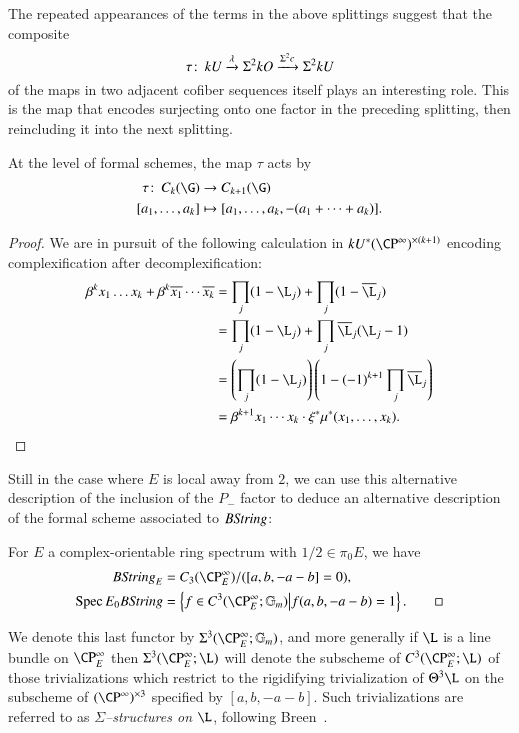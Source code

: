 The repeated appearances of the terms in the above splittings suggest that the composite \[\tau\colon\thinspace kU \xrightarrow{\lambda} \Sigma^2 kO \xrightarrow{\Sigma^2 c} \Sigma^2 kU\] of the maps in two adjacent cofiber sequences itself plays an interesting role.  This is the map that encodes surjecting onto one factor in the preceding splitting, then reincluding it into the next splitting.
\begin{lemma}
At the level of formal schemes, the map $\tau$ acts by
\begin{align*}
\tau\co C_k(\G) & \to C_{k+1}(\G) \\
[a_1, \ldots, a_k] & \mapsto [a_1, \ldots, a_k, -(a_1 + \cdots + a_k)].
\end{align*}
\end{lemma}
\begin{proof}
We are in pursuit of the following calculation in $kU^* (\CP^\infty)^{\times (k+1)}$ encoding complexification after decomplexification:
\begin{align*}
\beta^k x_1 \ldots x_k + \beta^k \overline{x_1} \cdots \overline{x_k} & = \prod_j (1 - \L_j) + \prod_j (1 - \overline \L_j) \\
& = \prod_j (1 - \L_j) + \prod_j \overline \L_j (\L_j - 1) \\
& = \left(\prod_j (1 - \L_j)\right) \left(1 - (-1)^{k+1} \prod_j \overline \L_j\right) \\
& = \beta^{k+1} x_1 \cdots x_k \cdot \xi^* \mu^*(x_1, \ldots, x_k). \qedhere
\end{align*}
\end{proof}
Still in the case where $E$ is local away from $2$, we can use this alternative description of the inclusion of the $P_-$ factor to deduce an alternative description of the formal scheme associated to $B\mathit{String}$:
\begin{corollary}
For $E$ a complex-orientable ring spectrum with $1/2 \in \pi_0 E$, we have
\begin{align*}
B\String_E & = C_3(\CP^\infty_E) / ([a, b, -a-b] = 0), \\
\Spec E_0 B\String & = \left\{ f \in C^3(\CP^\infty_E; \Gm) \middle| f(a, b, -a-b) = 1 \right\}. \qed
\end{align*}
\end{corollary}

\begin{definition}
We denote this last functor by $\Sigma^3(\CP^\infty_E; \Gm)$, and more generally if $\L$ is a line bundle on $\CP^\infty_E$ then $\Sigma^3(\CP^\infty_E; \L)$ will denote the subscheme of $C^3(\CP^\infty_E; \L)$ of those trivializations which restrict to the rigidifying trivialization of $\Theta^3 \L$ on the subscheme of $(\CP^\infty)^{\times 3}$ specified by $[a, b, -a-b]$.  Such trivializations are referred to as \textit{$\Sigma$--structures on $\L$}, following Breen~\cite[Section 5]{Breen}.
\end{definition}

